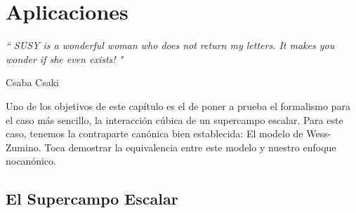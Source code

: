 \chapter{Aplicaciones}
\label{chap:8}

\epigraph{ \textit{`` SUSY is a wonderful woman who does not return my letters. It makes you wonder if she even exists! "} }{ Csaba Csaki~\cite{FrancisOnCsakaWeb2012}}

Uno de los objetivos de este capítulo es el de  poner a prueba el formalismo para el caso más sencillo, la interacción cúbica  de un  supercampo escalar. Para este caso, tenemos la contraparte canónica bien establecida: El modelo de Wess-Zumino. Toca demostrar la equivalencia entre este modelo y nuestro enfoque nocanónico. 
   
\section{El Supercampo Escalar}\label{Sec_ScalarSuperPotential}

